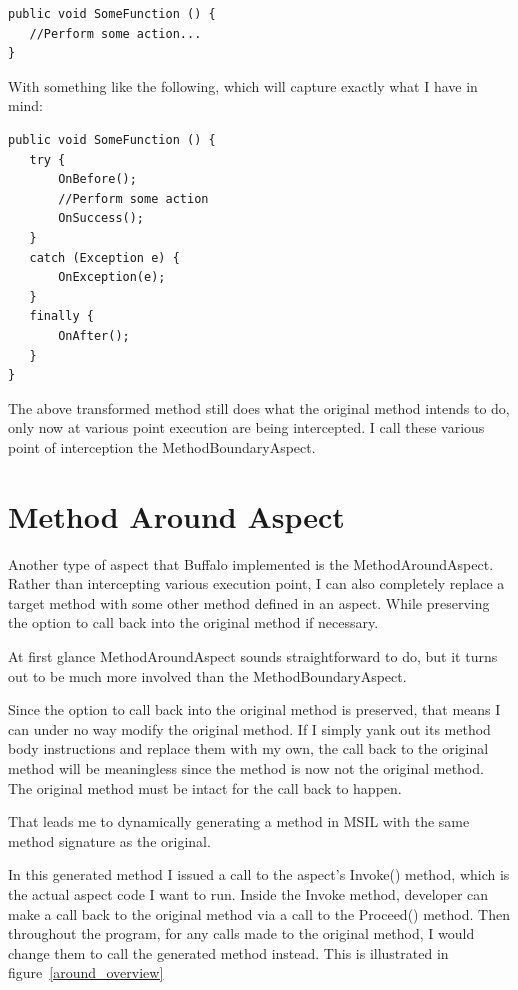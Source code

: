 \begin{lstlisting}[caption={Sample function}, label=samplefunction]
public void SomeFunction () {
   //Perform some action...
}
\end{lstlisting}

With something like the following, which will capture exactly what I have in mind:

\begin{lstlisting}[caption={Sample try-catch-finally}, label=sampletcf]
public void SomeFunction () {
   try {
       OnBefore();
       //Perform some action
       OnSuccess();
   }
   catch (Exception e) {
       OnException(e);
   }
   finally {
       OnAfter();
   }
}
\end{lstlisting}

The above transformed method still does what the original method intends to do, only now at various point execution are being intercepted. I call these various point of interception the MethodBoundaryAspect.

\section{Method Around Aspect}
Another type of aspect that Buffalo implemented is the MethodAroundAspect. Rather than intercepting various execution point, I can also completely replace a target method with some other method defined in an aspect. While preserving the option to call back into the original method if necessary.

At first glance MethodAroundAspect sounds straightforward to do, but it turns out to be much more involved than the MethodBoundaryAspect.

Since the option to call back into the original method is preserved, that means I can under no way modify the original method. If I simply yank out its method body instructions and replace them with my own, the call back to the original method will be meaningless since the method is now not the original method. The original method must be intact for the call back to happen.

That leads me to dynamically generating a method in MSIL with the same method signature as the original.

In this generated method I issued a call to the aspect’s Invoke() method, which is the actual aspect code I want to run. Inside the Invoke method, developer can make a call back to the original method via a call to the Proceed() method. Then throughout the program, for any calls made to the original method, I would change them to call the generated method instead. This is illustrated in figure~\ref{around_overview}

